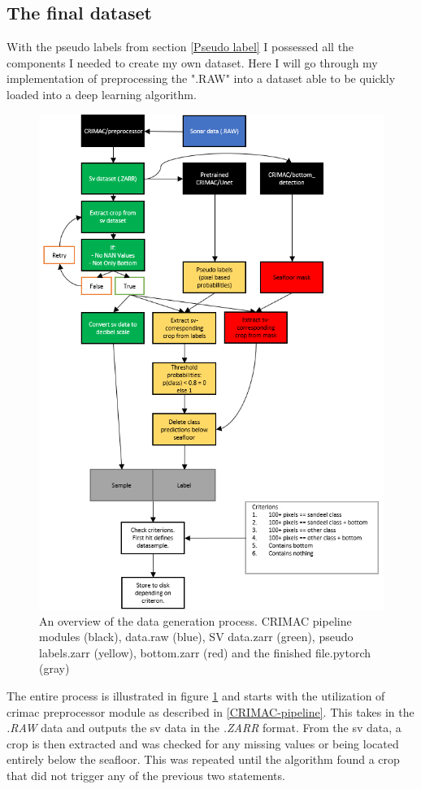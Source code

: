     \subsection{The final dataset}
        With the pseudo labels from section \ref{Pseudo label} I possessed all the components I needed to create my own dataset. Here I will go through my implementation of preprocessing the ".RAW" into a dataset able to be quickly loaded into a deep learning algorithm.
        \clearpage
        \begin{figure}[H]
            \centering
            \includegraphics[scale=0.8]{figures/flow_data_gen.png}
            \caption{An overview of the data generation process. CRIMAC pipeline modules (black), data.raw (blue), SV data.zarr (green), pseudo labels.zarr (yellow), bottom.zarr (red) and the finished file.pytorch (gray)}
          	\medskip 
            \label{data_generation_flowchart_fig}
        \end{figure}
        The entire process is illustrated in figure \ref{data_generation_flowchart_fig} and starts with the utilization of \gls{crimac} preprocessor module as described in \ref{CRIMAC-pipeline}. This takes in the \textit{.RAW} data and outputs the \gls{sv} data in the \textit{.ZARR} format. From the \gls{sv} data, a crop is then extracted and was checked for any missing values or being located entirely below the seafloor. This was repeated until the algorithm found a crop that did not trigger any of the previous two statements.
        
